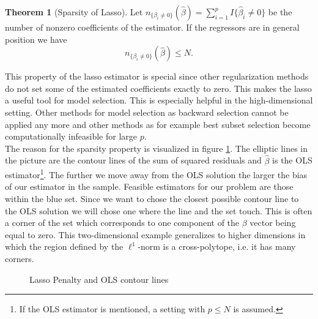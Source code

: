 \documentclass{article}
\theoremstyle{definition}
\newtheorem{theorem}{Theorem}
\begin{document}
\begin{theorem}[Sparsity of Lasso] \citep{tibshirani2013lasso} \label{theo: sparsity_lasso}
	Let $n_{\{\beta_i\neq 0\}}(\hat{\beta}) = \sum_{i=1}^{p} I \{\hat{\beta}_i \neq 0\}$ be the number of nonzero coefficients of the estimator.
	If the regressors are in general position we have 
	\begin{equation}
		n_{\{\beta_i\neq 0\}}(\hat{\beta}) \leq N.
	\end{equation}
\end{theorem}

This property of the lasso estimator is special since other regularization methods do not set some of the estimated coefficients exactly to zero. This makes the lasso a useful tool for model selection. This is especially helpful in the high-dimensional setting. Other methods for model selection as backward selection cannot be applied any more  and other methods as for example best subset selection become computationally infeasible for large $p$. \\

The reason for the sparsity property is visualized in figure \ref{lassopenalty}.
The elliptic lines in the picture are the contour lines of the sum of squared residuals and  $\hat{\beta}$ is the OLS estimator\footnote{If the OLS estimator is mentioned, a setting with $p\leq N$ is assumed.}. 
The further we move away from the OLS solution the larger the bias of our estimator in the sample.
Feasible estimators for our problem are those within the blue set.
Since we want to chose the closest possible contour line to the OLS solution we will chose one where the line and the set touch.
This is often a corner of the set which corresponds to one component of the $\beta$ vector being equal to zero. This two-dimensional example generalizes to higher dimensions in which the region defined by the $\ell^1$-norm is a cross-polytope, i.e. it has many corners. \newline

\begin{figure}
	\centering
	\caption{Lasso Penalty and OLS contour lines}
	\label{lassopenalty}
\end{figure}


\end{document}
